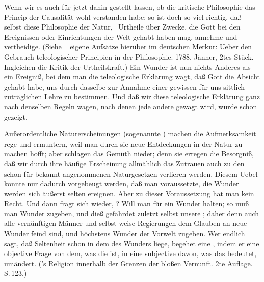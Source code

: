  Wenn wir es auch für jetzt dahin gestellt lassen, ob die kritische Philosophie das Princip der Causalität wohl verstanden habe; so ist doch so viel richtig, daß selbst diese Philosophie  der Natur, \dh\ Urtheile über Zwecke, die Gott bei den Ereignissen oder Einrichtungen der Welt gehabt haben mag, annehme und vertheidige. (Siehe \zB\  eigene Aufsätze hierüber im deutschen Merkur: Ueber den Gebrauch teleologischer Principien in der Philosophie. 1788. Jänner, 2tes Stück. Ingleichen die Kritik der Urtheilskraft.) Ein Wunder ist nun nichts Anderes als ein Ereigniß, bei dem man die teleologische Erklärung wagt, daß Gott die Absicht gehabt habe, uns durch dasselbe zur Annahme einer gewissen für uns sittlich zuträglichen Lehre zu bestimmen. Und daß wir diese teleologische Erklärung ganz nach denselben Regeln wagen, nach denen jede andere gewagt wird, wurde schon  gezeigt.\par
{} Außerordentliche Naturerscheinungen (sogenannte ) machen die Aufmerksamkeit rege und ermuntern, weil man durch sie neue Entdeckungen in der Natur zu machen hofft;  aber schlagen das Gemüth nieder; denn sie erregen die Besorgniß, daß wir durch ihre häufige Erscheinung allmählich das Zutrauen auch zu den schon für bekannt angenommenen Naturgesetzen verlieren werden. Diesem Uebel konnte nur dadurch vorgebeugt werden, daß man voraussetzte, die Wunder werden sich äußerst selten ereignen. Aber zu dieser Voraussetzung hat man kein Recht. Und dann fragt sich wieder, ? Will man  für ein Wunder halten; so muß man  Wunder zugeben, und dieß gefährdet zuletzt selbst unsere ; daher denn auch alle vernünftigen Männer und selbst weise Regierungen dem Glauben an neue Wunder feind sind, und höchstens Wunder der Vorwelt zugeben. Wer endlich sagt, daß Seltenheit schon in dem  des Wunders liege, begehet eine , indem er eine objective Frage von dem, was die  ist, in eine subjective davon, was das  bedeutet, umändert. ('s Religion innerhalb der Grenzen der bloßen Vernunft. 2te Auflage. S.\,123.)~\par
